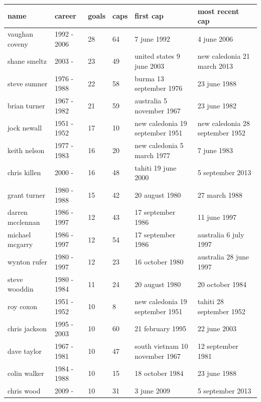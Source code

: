 \documentclass{article}
\begin{document}
\begin{tabular}{llllll}
\toprule
name & career & goals & caps & first cap & most recent cap \\
\midrule
vaughan coveny & 1992 - 2006 & 28 & 64 & 7 june 1992 & 4 june 2006 \\
shane smeltz & 2003 - & 23 & 49 & united states 9 june 2003 & new caledonia 21 march 2013 \\
steve sumner & 1976 - 1988 & 22 & 58 & burma 13 september 1976 & 23 june 1988 \\
brian turner & 1967 - 1982 & 21 & 59 & australia 5 november 1967 & 23 june 1982 \\
jock newall & 1951 - 1952 & 17 & 10 & new caledonia 19 september 1951 & new caledonia 28 september 1952 \\
keith nelson & 1977 - 1983 & 16 & 20 & new caledonia 5 march 1977 & 7 june 1983 \\
chris killen & 2000 - & 16 & 48 & tahiti 19 june 2000 & 5 september 2013 \\
grant turner & 1980 - 1988 & 15 & 42 & 20 august 1980 & 27 march 1988 \\
darren mcclennan & 1986 - 1997 & 12 & 43 & 17 september 1986 & 11 june 1997 \\
michael mcgarry & 1986 - 1997 & 12 & 54 & 17 september 1986 & australia 6 july 1997 \\
wynton rufer & 1980 - 1997 & 12 & 23 & 16 october 1980 & australia 28 june 1997 \\
steve wooddin & 1980 - 1984 & 11 & 24 & 20 august 1980 & 20 october 1984 \\
roy coxon & 1951 - 1952 & 10 & 8 & new caledonia 19 september 1951 & tahiti 28 september 1952 \\
chris jackson & 1995 - 2003 & 10 & 60 & 21 february 1995 & 22 june 2003 \\
dave taylor & 1967 - 1981 & 10 & 47 & south vietnam 10 november 1967 & 12 september 1981 \\
colin walker & 1984 - 1988 & 10 & 15 & 18 october 1984 & 23 june 1988 \\
chris wood & 2009 - & 10 & 31 & 3 june 2009 & 5 september 2013 \\
\bottomrule
\end{tabular}
\end{document}
